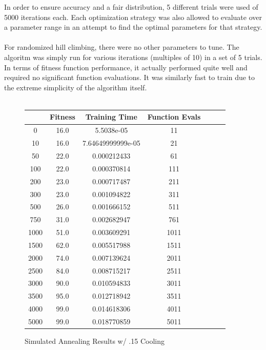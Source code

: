 \documentclass[h]{article}
\begin{document}
In order to ensure accuracy and a fair distribution, 5 different trials were 
used of 5000 iterations each.  Each optimization strategy was also allowed to evaluate over 
a parameter range in an attempt to find the optimal parameters for that 
strategy.
\\ \\
For randomized hill climbing, there were no other parameters to tune.  The 
algoritm was simply run for various iterations (multiples of 10) in a set of 5 
trials.  In terms of fitness function performance, it actually performed quite 
well and required no significant function evaluations. It was similarly fast to train due to the extreme simplicity 
of the algorithm itself. 
\\ \\
\begin{figure}[H] 
\begin{tabular}{ | c | c  | c | c | c | c | c |} 
\hline
\textbf{ } & \textbf{Fitness} & \textbf{Training Time} & \textbf{Function Evals}   \\
\hline
0 & 16.0 & 5.5038e-05 & 11 \\ \hline 
10 & 16.0 & 7.64649999999e-05 & 21 \\ \hline 
50 & 22.0 & 0.000212433 & 61 \\ \hline 
100 & 22.0 & 0.000370814 & 111 \\ \hline 
200 & 23.0 & 0.000717487 & 211 \\ \hline 
300 & 23.0 & 0.001094822 & 311 \\ \hline 
500 & 26.0 & 0.001666152 & 511 \\ \hline 
750 & 31.0 & 0.002682947 & 761 \\ \hline 
1000 & 51.0 & 0.003609291 & 1011 \\ \hline 
1500 & 62.0 & 0.005517988 & 1511 \\ \hline 
2000 & 74.0 & 0.007139624 & 2011 \\ \hline 
2500 & 84.0 & 0.008715217 & 2511 \\ \hline 
3000 & 90.0 & 0.010594833 & 3011 \\ \hline 
3500 & 95.0 & 0.012718942 & 3511 \\ \hline 
4000 & 99.0 & 0.014618306 & 4011 \\ \hline 
5000 & 99.0 & 0.018770859 & 5011 \\ \hline 

\end{tabular}
\caption*{Simulated Annealing Results w/ .15 Cooling} 
\end{figure}
\end{document}
